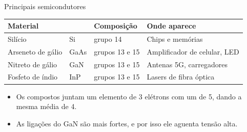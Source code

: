 \begin{frame}{Principais semicondutores}
  \begin{table}
    \centering
    \begin{tabular}{ll l l}
      \toprule
      \textbf{Material} & & \textbf{Composição} & \textbf{Onde aparece} \\
      \midrule
      Silício            & Si   & grupo 14      & Chips e memórias \\
      Arseneto de gálio  & GaAs & grupos 13 e 15 & Amplificador de celular, LED \\
      Nitreto de gálio   & GaN  & grupos 13 e 15 & Antenas 5G, carregadores \\
      Fosfeto de índio   & InP  & grupos 13 e 15 & Lasers de fibra óptica \\
      \bottomrule
    \end{tabular}
  \end{table}
  \begin{itemize}\small
    \item Os compostos juntam um elemento de 3 elétrons com um de 5, dando a
          mesma média de 4.
    \item As ligações do GaN são mais fortes, e por isso ele aguenta tensão
          alta.
  \end{itemize}
\end{frame}
